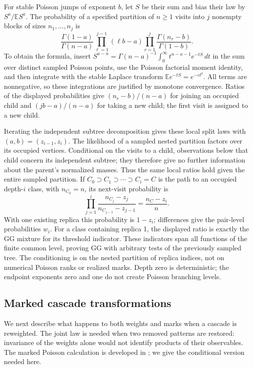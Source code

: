 \documentclass[11pt]{article}
\newcommand{\E}{\mathbb E}
\begin{document}
For stable Poisson jumps of exponent $b$, let $S$ be their sum and bias
their law by $S^a/\E S^a$. The probability of a specified partition of
$n\ge1$ visits into $j$ nonempty blocks of sizes $n_1,\ldots,n_j$ is
\[
 \frac{\Gamma(1-a)}{\Gamma(n-a)}
 \prod_{\ell=1}^{j-1}(\ell b-a)
 \prod_{r=1}^{j}\frac{\Gamma(n_r-b)}{\Gamma(1-b)}.
\]
To obtain the formula, insert
$S^{a-n}=\Gamma(n-a)^{-1}\int_0^\infty t^{n-a-1}e^{-tS}\,dt$
in the sum over distinct sampled Poisson points, use the Poisson factorial
moment identity, and then integrate with the stable Laplace transform
$\E e^{-tS}=e^{-ct^b}$. All terms are nonnegative, so these integrations
are justified by monotone convergence. Ratios of the displayed probabilities
give $(n_r-b)/(n-a)$ for joining an occupied child and $(jb-a)/(n-a)$
for taking a new child; the first visit is assigned to a new child.

Iterating the independent subtree decomposition gives these local split
laws with $(a,b)=(z_{i-1},z_i)$. The likelihood of a sampled nested
partition factors over its occupied vertices. Conditional on the visits to a
child, observations below that child concern its independent subtree; they
therefore give no further information about the parent's normalized masses.
Thus the same local ratios hold given the entire sampled partition. If
$C_0\supset C_1\supset\cdots\supset C_i=C$ is the path to an occupied
depth-$i$ class, with $n_{C_0}=n$, its next-visit probability is
\[
 \prod_{j=1}^i\frac{n_{C_j}-z_j}{n_{C_{j-1}}-z_{j-1}}
 =\frac{n_C-z_i}{n}.
\]
With one existing replica this probability is $1-z_i$; differences give
the pair-level probabilities $w_i$. For a class containing replica 1,
the displayed ratio is exactly the GG mixture for its threshold indicator.
These indicators span all functions of the finite common level, proving GG
with arbitrary tests of the previously sampled tree. The conditioning is on
the nested partition of replica indices, not on numerical Poisson ranks or
realized marks. Depth zero is deterministic; the endpoint exponents zero
and one do not create Poisson branching levels.

\subsection{Marked cascade transformations}

We next describe what happens to both weights and marks when a cascade is
reweighted. The joint law is needed when two removed patterns are restored:
invariance of the weights alone would not identify products of their
observables. The marked Poisson calculation is developed in
\cite[Lemmas~2.1 and~3.1, Corollary~3.2]{PanchenkoTalagrand2007Cascades};
we give the conditional version needed here.
\end{document}
